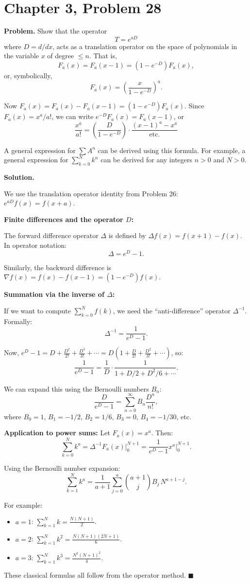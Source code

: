 \documentclass[12pt]{article}
\begin{document}
\section*{Chapter 3, Problem 28}

\textbf{Problem.} Show that the operator
\[
T = e^{aD}
\]
where $D = d/dx$, acts as a translation operator on the space of polynomials in the variable $x$ of degree $\le n$. That is,
\[
F_a(x) = F_a(x-1) = (1 - e^{-D})F_a(x),
\]
or, symbolically,
\[
F_a(x) = \left(\frac{x}{1 - e^{-D}}\right)^a.
\]

Now $F_a(x) = F_a(x) - F_a(x-1) = (1 - e^{-D})F_a(x)$. Since $F_a(x) = x^a/a!$, we can write $e^{-D}F_a(x) = F_a(x-1)$, or
\[
\frac{x^a}{a!} = \left(\frac{D}{1-e^{-D}}\right) \cdot \frac{(x-1)^a - x^a}{\text{etc.}}
\]

A general expression for $\sum A^n$ can be derived using this formula. For example, a general expression for $\sum_{k=0}^{N} k^n$ can be derived for any integers $n > 0$ and $N > 0$.

\bigskip
\textbf{Solution.}

We use the translation operator identity from Problem 26: $e^{aD}f(x) = f(x+a)$.

\medskip
\textbf{Finite differences and the operator $D$:}

The forward difference operator $\Delta$ is defined by $\Delta f(x) = f(x+1) - f(x)$. In operator notation:
\[
\Delta = e^D - 1.
\]

Similarly, the backward difference is $\nabla f(x) = f(x) - f(x-1) = (1 - e^{-D})f(x)$.

\medskip
\textbf{Summation via the inverse of $\Delta$:}

If we want to compute $\sum_{k=0}^{N} f(k)$, we need the ``anti-difference'' operator $\Delta^{-1}$. Formally:
\[
\Delta^{-1} = \frac{1}{e^D - 1}.
\]

Now, $e^D - 1 = D + \frac{D^2}{2!} + \frac{D^3}{3!} + \cdots = D\left(1 + \frac{D}{2!} + \frac{D^2}{3!} + \cdots\right)$, so:
\[
\frac{1}{e^D - 1} = \frac{1}{D} \cdot \frac{1}{1 + D/2 + D^2/6 + \cdots}.
\]

We can expand this using the Bernoulli numbers $B_n$:
\[
\frac{D}{e^D - 1} = \sum_{n=0}^{\infty} B_n \frac{D^n}{n!},
\]
where $B_0 = 1$, $B_1 = -1/2$, $B_2 = 1/6$, $B_3 = 0$, $B_4 = -1/30$, etc.

\medskip
\textbf{Application to power sums:} Let $F_a(x) = x^a$. Then:
\[
\sum_{k=0}^{N} k^a = \Delta^{-1} F_a(x)\Big|_0^{N+1} = \frac{1}{e^D - 1} x^a \Big|_0^{N+1}.
\]

Using the Bernoulli number expansion:
\[
\sum_{k=1}^{N} k^a = \frac{1}{a+1}\sum_{j=0}^{a} \binom{a+1}{j} B_j\, N^{a+1-j}.
\]

For example:
\begin{itemize}
    \item $a = 1$: $\sum_{k=1}^N k = \frac{N(N+1)}{2}$.
    \item $a = 2$: $\sum_{k=1}^N k^2 = \frac{N(N+1)(2N+1)}{6}$.
    \item $a = 3$: $\sum_{k=1}^N k^3 = \frac{N^2(N+1)^2}{4}$.
\end{itemize}

These classical formulas all follow from the operator method. \hfill $\blacksquare$
\end{document}
